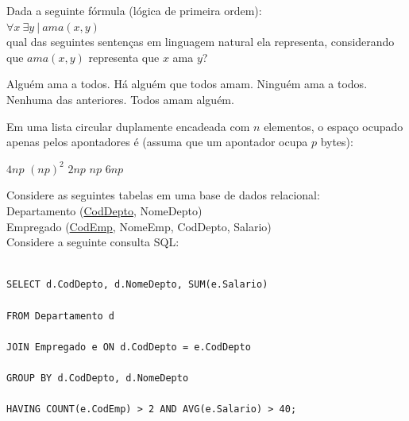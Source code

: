 \documentclass[12pt, addpoints]{exam}
\begin{document}
    \begin{questions}

    \newpage
    \question

Dada a seguinte fórmula (lógica de primeira ordem):\\

$\forall x \ \exists y \ | \ ama(x,y)$ \\

qual das seguintes sentenças em linguagem natural ela representa, considerando que \( ama(x,y) \) representa que \( x \) ama \( y \)?


\begin{choices}
\choice Alguém ama a todos.
\choice Há alguém que todos amam.
\choice Ninguém ama a todos.
\choice Nenhuma das anteriores.
\choice Todos amam alguém.
\end{choices}

\question

Em uma lista circular duplamente encadeada com \( n \) elementos, o espaço ocupado apenas pelos apontadores é (assuma que um apontador ocupa \( p \) bytes):
\begin{choices}
\choice \( 4np \)
\choice \( (np)^2 \)
\choice \( 2np \)
\choice \( np \)
\choice \( 6np \)
\end{choices}

\question

Considere as seguintes tabelas em uma base de dados relacional:\\

Departamento (\underline{CodDepto}, NomeDepto)\\

Empregado (\underline{CodEmp}, NomeEmp, CodDepto, Salario)\\

Considere a seguinte consulta SQL:

\begin{verbatim}

SELECT d.CodDepto, d.NomeDepto, SUM(e.Salario)

FROM Departamento d

JOIN Empregado e ON d.CodDepto = e.CodDepto

GROUP BY d.CodDepto, d.NomeDepto

HAVING COUNT(e.CodEmp) > 2 AND AVG(e.Salario) > 40;

\end{verbatim}




\end{questions}
\end{document}
